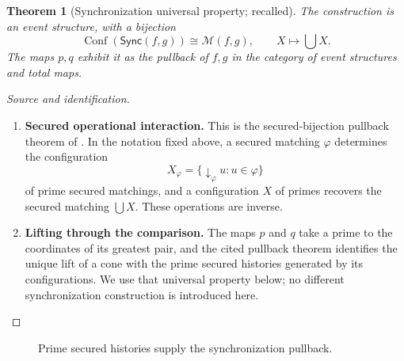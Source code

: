 \documentclass[11pt,a4paper]{article}
\numberwithin{equation}{section}
\newtheorem{theorem}{Theorem}[section]
\theoremstyle{definition}
\theoremstyle{remark}
\theoremstyle{plain}
\begin{document}
\begin{theorem}[Synchronization universal property; recalled]
\label{thm:egt-pullback}
The construction is an event structure, with a bijection
\[
 \operatorname{Conf}(\mathsf{Sync}(f,g))\cong\mathcal M(f,g),
 \qquad X\longmapsto\bigcup X.
\]
The maps $p,q$ exhibit it as the pullback of $f,g$ in the category of
event structures and total maps.
\end{theorem}
\begin{proof}[Source and identification]
\leavevmode
\begin{enumerate}[label=\textup{(\arabic*)},leftmargin=*,itemsep=4pt,topsep=3pt]
  \item \textbf{Secured operational interaction.} This is the secured-bijection pullback theorem of
\citet{CastellanEtAl2017}. In the notation fixed above, a secured
matching $\varphi$ determines the configuration
\[
 X_\varphi=\{\downarrow_\varphi u:u\in\varphi\}
\]
of prime secured matchings, and a configuration $X$ of primes recovers the
secured matching $\bigcup X$. These operations are inverse.
  \item \textbf{Lifting through the comparison.} The maps $p$
and $q$ take a prime to the coordinates of its greatest pair, and the
cited pullback theorem identifies the unique lift of a cone with the prime
secured histories generated by its configurations. We use that universal
property below; no different synchronization construction is introduced
here.
\end{enumerate}
\end{proof}

\begin{figure}[htbp]
\centering
{}
\caption{Prime secured histories supply the synchronization pullback.}
\end{figure}
\end{document}
